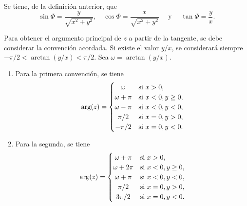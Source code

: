 
\bigskip

Se tiene, de la definición anterior, que
\begin{equation*}
     \sin \Phi = \frac{y}{\sqrt{x^2 + y^2}},\quad \cos \Phi = \frac{x}{\sqrt{x^2 + y^2}}\quad \text{ y } \quad\tan \Phi = \frac{y}{x}.
\end{equation*}

Para obtener el argumento principal de $z$ a partir de la tangente, se debe considerar la convención acordada. Si existe el valor $y/x$, se considerará siempre $-\pi/2 < \arctan(y/x) < \pi/2$. Sea $\omega = \arctan(y/x)$.
\begin{multicols}{2}
\begin{enumerate}[label=\textnormal{(\roman*)}]
\item Para la primera convención, se tiene 
    \begin{equation*}
        \arg(z) = \begin{cases}
            \hfil \omega & \text{si } x>0, \\
            \hfil \omega + \pi & \text{si } x<0, y \ge 0, \\
            \hfil \omega - \pi & \text{si } x<0, y<0, \\
            \hfil \pi/2 & \text{si } x=0, y>0, \\
            \hfil -\pi/2 & \text{si } x=0, y<0.
        \end{cases}
    \end{equation*}
\item Para la segunda, se tiene 
    \begin{equation*}
        \arg(z) = \begin{cases}
            \hfil \omega + \pi & \text{si } x>0, \\
            \hfil \omega + 2 \pi & \text{si } x<0, y \ge 0, \\
            \hfil \omega + \pi & \text{si } x<0, y<0, \\
            \hfil \pi/2 & \text{si } x=0, y>0, \\
            \hfil 3 \pi/2 & \text{si } x=0, y<0.
        \end{cases}
    \end{equation*}
\end{enumerate}
\end{multicols}
